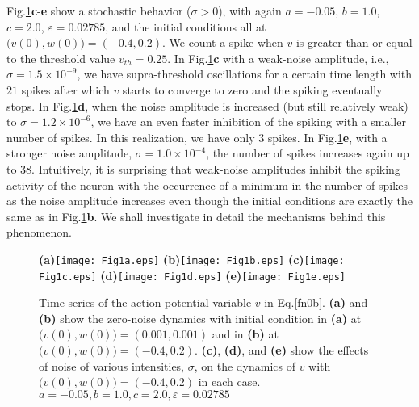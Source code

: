Fig.\ref{fig:chap31}\textbf{c}-\textbf{e} show a stochastic behavior
($\sigma>0$), with again $a=-0.05$, $b=1.0$, $c=2.0$,
$\varepsilon=0.02785$, and the initial conditions all at
$\big(v(0),w(0)\big)=(-0.4,0.2)$. We
count a spike when $v$ is greater than or equal to the threshold
value $v_{th}=0.25$. In Fig.\ref{fig:chap31}\textbf{c} with a weak-noise
amplitude, i.e., $\sigma=1.5\times10^{-9}$, we have supra-threshold
oscillations for a certain time length with  $21$ spikes after
which $v$ starts to converge to zero and the spiking eventually
stops. In Fig.\ref{fig:chap31}\textbf{d}, when the noise
amplitude is increased (but still relatively weak) to
$\sigma=1.2\times10^{-6}$, we have an even faster inhibition of the spiking with a smaller number of spikes.
In this realization, we have only $3$
spikes. In Fig.\ref{fig:chap31}\textbf{e}, with a stronger noise
amplitude, $\sigma=1.0\times10^{-4}$, the number of spikes
increases again up to $38$. Intuitively, it is surprising that
weak-noise amplitudes inhibit the spiking activity of the neuron
with the occurrence of a minimum in the number of spikes as the noise
amplitude increases even though the initial conditions are exactly
the same as in Fig.\ref{fig:chap31}\textbf{b}. 
We shall investigate in detail the mechanisms behind this phenomenon.
\begin{figure}%
\begin{center}
\textbf{(a)}\texttt{[image: Fig1a.eps]}
\textbf{(b)}\texttt{[image: Fig1b.eps]}
\textbf{(c)}\texttt{[image: Fig1c.eps]}
\textbf{(d)}\texttt{[image: Fig1d.eps]}
\textbf{(e)}\texttt{[image: Fig1e.eps]}
\caption{Time series of the action potential variable $v$ in Eq.\eqref{fn0b}. \textbf{(a)} and
\textbf{(b)} show the zero-noise dynamics with initial condition in \textbf{(a)} at
$\big(v(0),w(0)\big)=(0.001,0.001)$ and in \textbf{(b)} at $\big(v(0),w(0)\big)=(-0.4,0.2)$.
\textbf{(c)}, \textbf{(d)}, and \textbf{(e)} show the effects of noise of various intensities, $\sigma$, on
the dynamics of $v$ with $\big(v(0),w(0)\big)=(-0.4,0.2)$ in each case.
$a=-0.05, b=1.0, c=2.0, \varepsilon=0.02785$ } \label{fig:chap31}
\end{center}
\end{figure}
